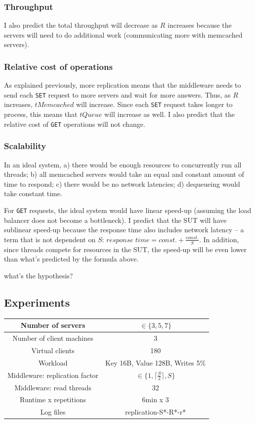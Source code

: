 \documentclass[11pt]{article}
\newcommand{\get}[0]{\texttt{GET}}
\newcommand{\set}[0]{\texttt{SET}}
\newcommand{\todo}[1]{\fcolorbox{black}{Apricot}{TODO: #1}}
\begin{document}
\subsubsection{Throughput}
I also predict the total throughput will decrease as $R$ increases because the servers will need to do additional work (communicating more with memcached servers).

\subsubsection{Relative cost of operations}
As explained previously, more replication means that the middleware needs to send each \set{} request to more servers and wait for more answers. Thus, as $R$ increases, $tMemcached$ will increase. Since each \set{} request takes longer to process, this means that $tQueue$ will increase as well. I also predict that the relative cost of \get{} operations will not change.

\subsubsection{Scalability}
\label{sec:exp2:hyp:scalability}

In an ideal system, a) there would be enough resources to concurrently run all threads; b) all memcached servers would take an equal and constant amount of time to respond; c) there would be no network latencies; d) dequeueing would take constant time.

For \get{} requests, the ideal system would have linear speed-up (assuming the load balancer does not become a bottleneck). I predict that the SUT will have sublinear speed-up because the response time also includes network latency -- a term that is not dependent on $S$: $response \; time = const. + \frac{const.}{S}$. In addition, since threads compete for resources in the SUT, the speed-up will be even lower than what's predicted by the formula above.

\todo{and for sets?} what's the hypothesis?

\subsection{Experiments}
\begin{center}
\small{
\smallskip
\begin{tabular}{|c|c|}
\hline Number of servers & $\in \{3, 5, 7\}$ \\ 
\hline Number of client machines & 3 \\ 
\hline Virtual clients & 180 \\ 
\hline Workload & Key 16B, Value 128B, Writes 5\% \\
\hline Middleware: replication factor & $\in \{1, \lceil\frac{S}{2}\rceil, S\}$ \\ 
\hline Middleware: read threads & 32 \\ 
\hline Runtime x repetitions & 6min x 3 \\ 
\hline Log files & replication-S*-R*-r* \\
\hline 
\end{tabular} }
\end{center}
\end{document}
